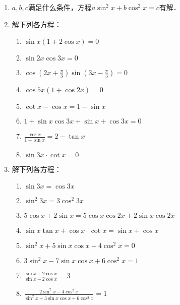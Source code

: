 \begin{enumerate}
\item $a,b,c$满足什么条件，方程$a\sin^2 x+b\cos^2 x=c$有解．

\item 解下列各方程：
   \begin{enumerate}
\item $\sin x(1+2 \cos x)=0$
\item  $\sin 2 x \cos 3 x=0$
\item  $\cos \left(2 x+\frac{\pi}{3}\right) \sin \left(3 x-\frac{\pi}{3}\right)=0$
\item  $\cos 5 x(1+\cos 2 x)=0$
\item $\cot x-\cos x=1-\sin x$
\item  $1+\sin x \cos 3 x+\sin x+\cos 3 x=0$
\item $\frac{\cos x}{1+\sin x}=2-\tan x$
\item $\sin 3 x \cdot \cot x=0$
\end{enumerate} 

\item 解下列各方程：
\begin{enumerate}
 \item  $\sin 3 x=\cos 3 x$
\item  $\sin ^{2} 3 x=3 \cos ^{2} 3 x$
\item $ 5 \cos x+2 \sin x=5 \cos x \cos 2 x+2 \sin x \cos 2 x$   
\item $\sin x \tan x+\cos x \cdot \cot x=\sin x+\cos x$
\item $\sin ^{2} x+5 \sin x \cos x+4 \cos ^{2} x=0$
\item $3 \sin ^{2} x-7 \sin x \cos x+6 \cos ^{2} x=1$
\item $\frac{\sin x+2 \cos x}{\sin x-2 \cos x}=3$
\item  $\frac{2 \sin ^{2} x-4 \cos ^{2} x}{\sin ^{2} x+3 \sin x \cos x+6 \cos ^{2} x}=1$
\end{enumerate}


\end{enumerate}
